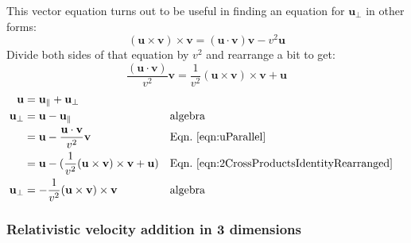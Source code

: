 \documentclass[a4paper]{article}
\theoremstyle{plain}
\theoremstyle{definition}
\newcommand{\vect}[1]{\mathbf{#1}}
\begin{document}
This vector equation turns out to be useful in finding an equation for
$\vect{u}_{\perp}$ in other forms:
\begin{equation}
(\vect{u} \times \vect{v}) \times \vect{v} = (\vect{u} \cdot \vect{v}) \vect{v} - v^2 \vect{u} \label{eqn:2CrossProductsIdentity}
\end{equation}
Divide both sides of that equation by $v^2$ and rearrange a bit to get:
\begin{equation}
\frac{(\vect{u} \cdot \vect{v})}{v^2} \vect{v} = \frac{1}{v^2} (\vect{u} \times \vect{v}) \times \vect{v} + \vect{u} \label{eqn:2CrossProductsIdentityRearranged}
\end{equation}
\begin{align}
\vect{u} & = \vect{u}_{\parallel} + \vect{u}_{\perp} \nonumber \\
\vect{u}_{\perp}
  & = \vect{u} - \vect{u}_{\parallel} & & \text{algebra} \nonumber \\
  & = \vect{u} - \frac{\vect{u} \cdot \vect{v}}{v^2} \vect{v} & & \text{Eqn.~\eqref{eqn:uParallel}} \nonumber \\
  & = \vect{u} - (\frac{1}{v^2} (\vect{u} \times \vect{v}) \times \vect{v} + \vect{u}) & & \text{Eqn.~\eqref{eqn:2CrossProductsIdentityRearranged}} \nonumber \\\vect{u}_{\perp}
  & = - \frac{1}{v^2} (\vect{u} \times \vect{v}) \times \vect{v} & & \text{algebra} \label{eqn:uPerpendicular}
\end{align}


\subsubsection{Relativistic velocity addition in 3 dimensions}
\label{app:3drelvelocityadd}
\end{document}
